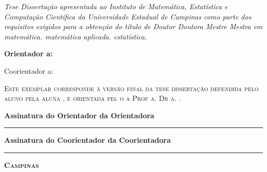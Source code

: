 \begin{flushright}
  \begin{minipage}[c]{.5\textwidth}
    \textit{\ifx\mestrado\undefined
    Tese
    \else
    Dissertação
    \fi
    apresentada ao Instituto de Matemática,
    Estatística e Computação Científica da Universidade
    Estadual de Campinas como parte dos requisitos exigidos
    para a obtenção do título de
    \ifx\mestrado\undefined
    \ifx\femaleAuthor\undefined
    Doutor
    \else
    Doutora
    \fi
    \else
    \ifx\femaleAuthor\undefined
    Mestre
    \else
    Mestra
    \fi
    \fi
    em
    \ifx\matematica\undefined
    \else
    matemática.
    \fi
    \ifx\aplicada\undefined
    \else
    matemática aplicada.
    \fi
    \ifx\estatistica\undefined
    \else
    estatística.
    \fi
    }
  \end{minipage}
\end{flushright}
\vspace{.5cm}

\noindent
{\bfseries
\noindent
Orientador\ifx\femaleOrientador\undefined
\else
a\fi: \orientador
\vspace{.25cm}

\ifx\coorientador\undefined
\else
\noindent
Coorientador\ifx\femaleCoorientador\undefined
\else
a\fi: \coorientador
\fi
}
\vspace{.5cm}

\noindent
\begin{minipage}[c]{.5\textwidth}
  \noindent
  {\footnotesize \scshape
  Este exemplar corresponde à versão final da
  \ifx\mestrado\undefined
  tese
  \else
  dissertação
  \fi
  defendida
  \ifx\femaleAuthor\undefined
  pelo aluno
  \else
  pela aluna
  \fi
  \autor,
  e orientada pel\ifx\femaleOrientador\undefined
  o\else
  a\fi{} Prof\ifx\femaleOrientador\undefined
  \else
  a\fi. Dr\ifx\femaleOrientador\undefined
  \else
  a\fi. \orientador.
  }
\end{minipage}
\vspace{.5cm}

\noindent
{\small \bfseries
\noindent
Assinatura
\ifx\femaleOrientador\undefined
do Orientador
\else
da Orientadora
\fi

\vspace{.3cm}
\noindent
\rule[1pt]{7cm}{.5pt}  %
}
\vspace{.4cm}

\ifx\coorientador\undefined
\else
{\small \bfseries
\noindent
Assinatura
\ifx\femaleCoorientador\undefined
do Coorientador
\else
da Coorientadora
\fi

\vspace{.3cm}
\noindent
\rule[1pt]{7cm}{.5pt}  %
}
\fi
\vfill
\begin{center}
  {\small \scshape \bfseries Campinas \\ \ano}
\end{center}
